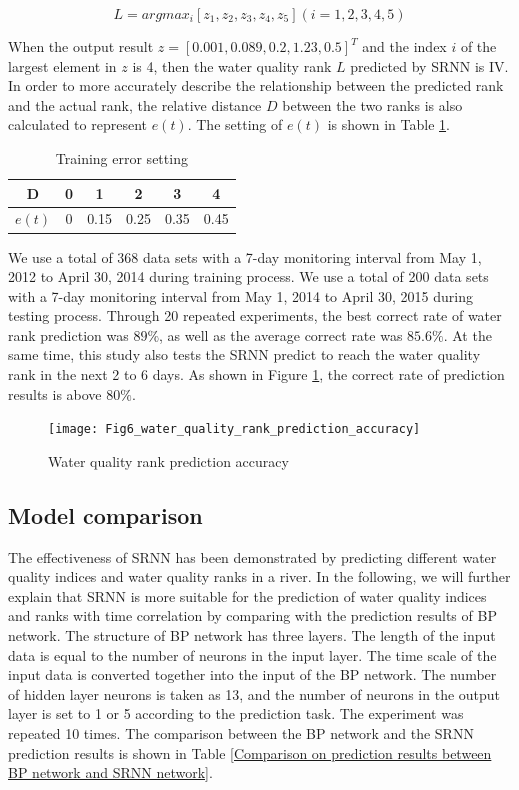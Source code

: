 \documentclass[runningheads]{llncs}
\begin{document}
\begin{equation}
L=argmax_i[z_1,z_2,z_3,z_4,z_5 ](i=1,2,3,4,5)
\end{equation}

When the output result $z = [0.001, 0.089, 0.2, 1.23, 0.5]^T$ and the index $i$ of 
the largest element in $z$ is 4, then the water quality rank $L$ predicted by SRNN is IV. 
In order to more accurately describe the relationship between the predicted 
rank and the actual rank, the relative distance $D$ between the two ranks 
is also calculated to represent $e(t)$. The setting of $e(t)$ is shown in Table \ref{Training error setting}.
\begin{table}[htbp] 
\centering
\caption{Training error setting}
\label{Training error setting}
\begin{tabular}{cccccc} 
\toprule 
D&0&1&2&3&4\\ 
\midrule 
$e(t)$&0&0.15&0.25&0.35&0.45\\ 
\bottomrule 
\end{tabular} 
\end{table}

We use a total of 368 data sets with a 7-day monitoring interval from May 1,
2012 to April 30, 2014 during training process. We use a total of 200 data sets with a 
7-day monitoring interval from May 1, 2014 to April 30, 2015 during testing process. 
Through 20 repeated experiments, the best correct rate of water rank prediction was $89\%$,
as well as the average correct rate was $85.6\%$. At the same time, 
this study also tests the SRNN predict to reach the water quality
rank in the next 2 to 6 days.  As shown in Figure \ref{Water quality rank prediction accuracy},
the correct rate of prediction results is above $80\%$.

\begin{figure}[htbp]
\centering
\texttt{[image: Fig6\_water\_quality\_rank\_prediction\_accuracy]}
\caption{Water quality rank prediction accuracy}
\label{Water quality rank prediction accuracy}
\end{figure}

\subsection{Model comparison}
The effectiveness of SRNN has been demonstrated by predicting 
different water quality indices and water quality ranks in a river. 
In the following, we will further explain that SRNN is more suitable 
for the prediction of water quality indices and ranks with time 
correlation by comparing with the prediction results of BP network. 
The structure of BP network has three layers.
The length of the input data is equal to the number of neurons in the input layer.
The time scale of the input data is converted together into the input of 
the BP network. The number of hidden layer neurons is taken as 13, 
and the number of neurons in the output layer is set to 1 or 5 according 
to the prediction task. The experiment was repeated 10 times. 
The comparison between the BP network and the SRNN prediction results is shown in Table 
\ref{Comparison on prediction results between BP network and SRNN network}.
\end{document}
